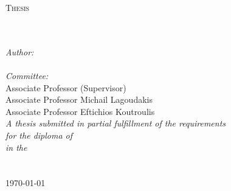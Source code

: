 \documentclass[
11pt, %
onehalfspacing, %
headsepline, %
]{MastersDoctoralThesis} %
\author{Filippos Christianos} %
\begin{document}
\frontmatter %

\pagestyle{plain} %


\begin{titlepage}
\begin{center}
	



{\scshape\LARGE \univname\par}\vspace{1.5cm} %
\vspace{-20pt}
\textsc{\Large Thesis}\\[0.5cm] %

\HRule \\[0.4cm] %
{\huge \bfseries \ttitle\par}\vspace{0.4cm} %
\HRule \\[1.5cm] %
\vspace{-20pt}
\emph{Author:}\\
{\authorname}\\ %
\vspace{20pt}
\emph{Committee:} \\
{Associate Professor} {\supname} (Supervisor)\\
{Associate Professor} Michail Lagoudakis\\
{Associate Professor} Eftichios Koutroulis\\
 \vspace{30pt}
\large \textit{A thesis submitted in partial fulfillment of the requirements\\ for the diploma of \degreename}\\[0.3cm] %
\textit{in the}\\[0.4cm]
\deptname\\\univname\\[2cm] %
 
{\large \today}\\[4cm] %
 
\vfill
\end{center}
\end{titlepage}
\end{document}
